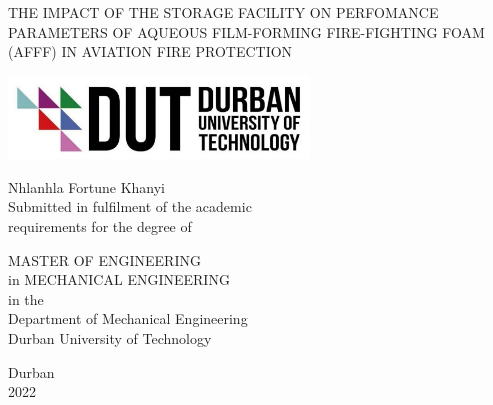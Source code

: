 \begin{titlepage}
\begin{center}

    \vspace*{1cm}

    \large
    THE IMPACT OF THE STORAGE FACILITY ON PERFOMANCE PARAMETERS OF AQUEOUS FILM-FORMING FIRE-FIGHTING FOAM (AFFF) IN AVIATION FIRE PROTECTION

    \vspace{2cm}

    \includegraphics[width=0.6\textwidth]{images/logo.png}

    \Large
    Nhlanhla Fortune Khanyi \\
    
    \large
    Submitted in fulfilment of the academic\\
    requirements for the degree of

    \vspace{1.5cm}

    MASTER OF ENGINEERING \\
    in MECHANICAL ENGINEERING \\
    in the \\

    Department of Mechanical Engineering \\
    Durban University of Technology

    \vspace{1cm}

    \normalsize
    Durban \\
    2022

\end{center}
\end{titlepage}